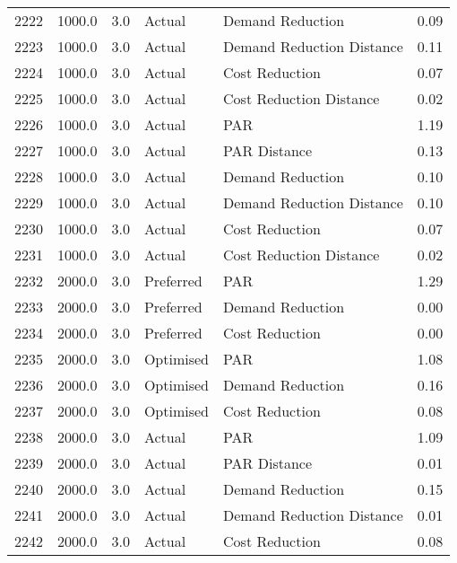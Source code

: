 \begin{longtable}{lrrllr}
2222 &       1000.0 &     3.0 &         Actual &           Demand Reduction &   0.09 \\
2223 &       1000.0 &     3.0 &         Actual &  Demand Reduction Distance &   0.11 \\
2224 &       1000.0 &     3.0 &         Actual &             Cost Reduction &   0.07 \\
2225 &       1000.0 &     3.0 &         Actual &    Cost Reduction Distance &   0.02 \\
2226 &       1000.0 &     3.0 &         Actual &                        PAR &   1.19 \\
2227 &       1000.0 &     3.0 &         Actual &               PAR Distance &   0.13 \\
2228 &       1000.0 &     3.0 &         Actual &           Demand Reduction &   0.10 \\
2229 &       1000.0 &     3.0 &         Actual &  Demand Reduction Distance &   0.10 \\
2230 &       1000.0 &     3.0 &         Actual &             Cost Reduction &   0.07 \\
2231 &       1000.0 &     3.0 &         Actual &    Cost Reduction Distance &   0.02 \\
2232 &       2000.0 &     3.0 &      Preferred &                        PAR &   1.29 \\
2233 &       2000.0 &     3.0 &      Preferred &           Demand Reduction &   0.00 \\
2234 &       2000.0 &     3.0 &      Preferred &             Cost Reduction &   0.00 \\
2235 &       2000.0 &     3.0 &      Optimised &                        PAR &   1.08 \\
2236 &       2000.0 &     3.0 &      Optimised &           Demand Reduction &   0.16 \\
2237 &       2000.0 &     3.0 &      Optimised &             Cost Reduction &   0.08 \\
2238 &       2000.0 &     3.0 &         Actual &                        PAR &   1.09 \\
2239 &       2000.0 &     3.0 &         Actual &               PAR Distance &   0.01 \\
2240 &       2000.0 &     3.0 &         Actual &           Demand Reduction &   0.15 \\
2241 &       2000.0 &     3.0 &         Actual &  Demand Reduction Distance &   0.01 \\
2242 &       2000.0 &     3.0 &         Actual &             Cost Reduction &   0.08 \\

\end{longtable}
